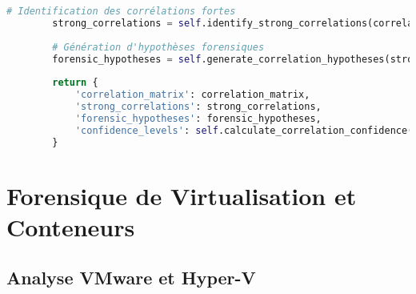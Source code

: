 \begin{lstlisting}[language=Python, caption=Reconstructeur de timeline avec validation CRO]
        # Identification des corrélations fortes
        strong_correlations = self.identify_strong_correlations(correlation_matrix)
        
        # Génération d'hypothèses forensiques
        forensic_hypotheses = self.generate_correlation_hypotheses(strong_correlations)
        
        return {
            'correlation_matrix': correlation_matrix,
            'strong_correlations': strong_correlations,
            'forensic_hypotheses': forensic_hypotheses,
            'confidence_levels': self.calculate_correlation_confidence(correlation_matrix)
        }
\end{lstlisting}

\section{Forensique de Virtualisation et Conteneurs}

\subsection{Analyse VMware et Hyper-V}

